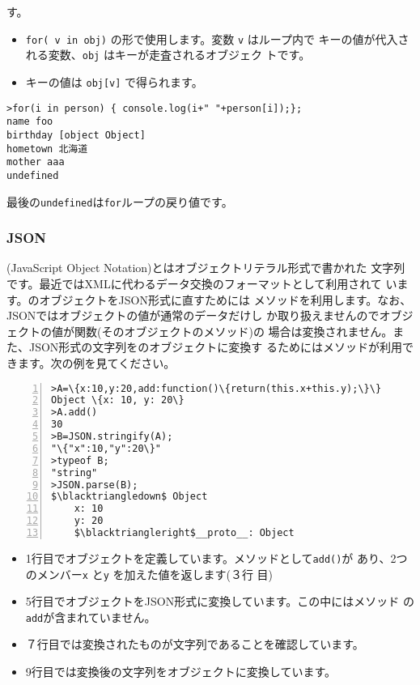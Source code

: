 \begin{itemize}
			 す。
\begin{itemize}
 \item \Verb+for( v in obj)+ の形で使用します。変数 \Verb+v+ はループ内で
       キーの値が代入される変数、\Verb+obj+ はキーが走査されるオブジェク
       トです。
 \item キーの値は \Verb+obj[v]+ で得られます。
\end{itemize}
\begin{Verbatim}[fontsize=\small]
>for(i in person) { console.log(i+" "+person[i]);};
name foo
birthday [object Object]
hometown 北海道
mother aaa
undefined
\end{Verbatim}
最後の\Verb+undefined+は\Verb+for+ループの戻り値です。
\end{itemize}
\subsubsection{JSON}
(JavaScript Object Notation)とはオブジェクトリテラル形式で書かれた
文字列です。最近ではXMLに代わるデータ交換のフォーマットとして利用されて
います。\JS のオブジェクトをJSON形式に直すためには
メソッドを利用します。なお、JSONではオブジェクトの値が通常のデータだけし
か取り扱えませんのでオブジェクトの値が関数(そのオブジェクトのメソッド)の
場合は変換されません。また、JSON形式の文字列を\JS のオブジェクトに変換す
るためにはメソッドが利用できます。次の例を見てください。
\begin{Verbatim}[numbers=left, fontsize=\small,
	commandchars=\\\{\},
	codes={\catcode`$=3\catcode`^=7}]
>A=\{x:10,y:20,add:function()\{return(this.x+this.y);\}\}
Object \{x: 10, y: 20\}
>A.add()
30
>B=JSON.stringify(A);
"\{"x":10,"y":20\}"
>typeof B;
"string"
>JSON.parse(B);
$\blacktriangledown$ Object
	x: 10
	y: 20
	$\blacktriangleright$__proto__: Object
\end{Verbatim}
\begin{itemize}
 \item 1行目でオブジェクトを定義しています。メソッドとして\Verb+add()+が
			 あり、2つのメンバー\Verb+x+ と\Verb+y+ を加えた値を返します(３行
			 目)
 \item 5行目でオブジェクトをJSON形式に変換しています。この中にはメソッド
			 の\Verb+add+が含まれていません。
 \item ７行目では変換されたものが文字列であることを確認しています。
 \item 9行目では変換後の文字列をオブジェクトに変換しています。
\end{itemize}
